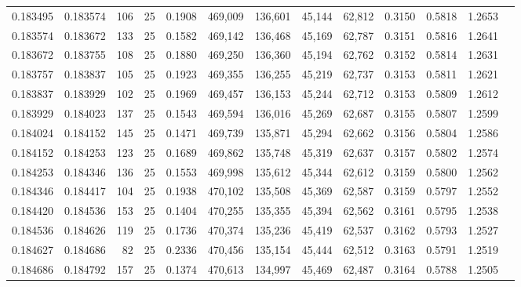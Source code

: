 \begin{tabular}{rrrrrrrrrrrrr}
0.183495 & 0.183574 &   106 &  25 &                                     0.1908 & 469,009 & 136,601 &  45,144 &  62,812 & 0.3150 & 0.5818 & 1.2653 \\
0.183574 & 0.183672 &   133 &  25 &                                     0.1582 & 469,142 & 136,468 &  45,169 &  62,787 & 0.3151 & 0.5816 & 1.2641 \\
0.183672 & 0.183755 &   108 &  25 &                                     0.1880 & 469,250 & 136,360 &  45,194 &  62,762 & 0.3152 & 0.5814 & 1.2631 \\
0.183757 & 0.183837 &   105 &  25 &                                     0.1923 & 469,355 & 136,255 &  45,219 &  62,737 & 0.3153 & 0.5811 & 1.2621 \\
0.183837 & 0.183929 &   102 &  25 &                                     0.1969 & 469,457 & 136,153 &  45,244 &  62,712 & 0.3153 & 0.5809 & 1.2612 \\
0.183929 & 0.184023 &   137 &  25 &                                     0.1543 & 469,594 & 136,016 &  45,269 &  62,687 & 0.3155 & 0.5807 & 1.2599 \\
0.184024 & 0.184152 &   145 &  25 &                                     0.1471 & 469,739 & 135,871 &  45,294 &  62,662 & 0.3156 & 0.5804 & 1.2586 \\
0.184152 & 0.184253 &   123 &  25 &                                     0.1689 & 469,862 & 135,748 &  45,319 &  62,637 & 0.3157 & 0.5802 & 1.2574 \\
0.184253 & 0.184346 &   136 &  25 &                                     0.1553 & 469,998 & 135,612 &  45,344 &  62,612 & 0.3159 & 0.5800 & 1.2562 \\
0.184346 & 0.184417 &   104 &  25 &                                     0.1938 & 470,102 & 135,508 &  45,369 &  62,587 & 0.3159 & 0.5797 & 1.2552 \\
0.184420 & 0.184536 &   153 &  25 &                                     0.1404 & 470,255 & 135,355 &  45,394 &  62,562 & 0.3161 & 0.5795 & 1.2538 \\
0.184536 & 0.184626 &   119 &  25 &                                     0.1736 & 470,374 & 135,236 &  45,419 &  62,537 & 0.3162 & 0.5793 & 1.2527 \\
0.184627 & 0.184686 &    82 &  25 &                                     0.2336 & 470,456 & 135,154 &  45,444 &  62,512 & 0.3163 & 0.5791 & 1.2519 \\
0.184686 & 0.184792 &   157 &  25 &                                     0.1374 & 470,613 & 134,997 &  45,469 &  62,487 & 0.3164 & 0.5788 & 1.2505 \\

\end{tabular}
